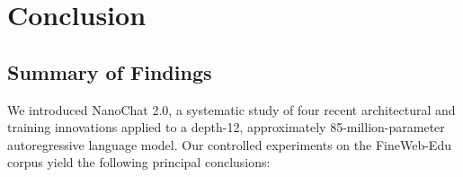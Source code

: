 \section{Conclusion}

\subsection{Summary of Findings}

We introduced NanoChat 2.0, a systematic study of four recent architectural and training
innovations applied to a depth-12, approximately 85-million-parameter autoregressive language
model.
Our controlled experiments on the FineWeb-Edu corpus yield the following principal conclusions:

